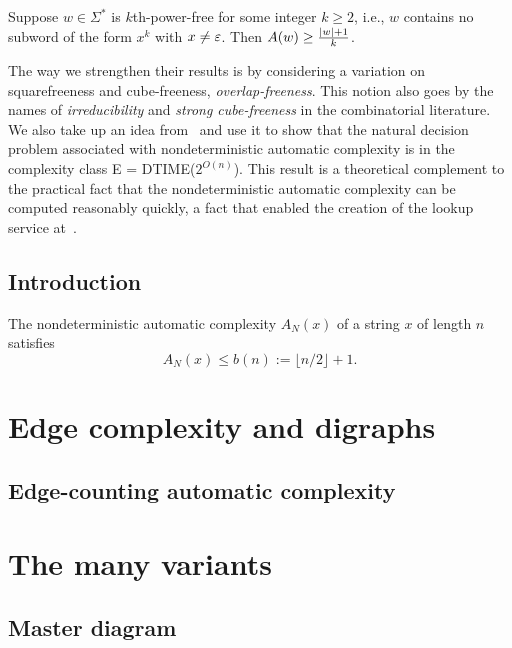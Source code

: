 	\begin{theorem}\label{thm:sw9}
		Suppose $w\in\Sigma^*$ is $k$th-power-free for some integer $k\ge 2$, i.e., $w$ contains no subword of the form $x^k$ with $x\ne\varepsilon$.
		Then $A(w)\ge\frac{\lvert w\rvert+1}k$.
	\end{theorem}
	The way we strengthen their results is by considering a variation
	on squarefreeness and cube-freeness, \emph{overlap-freeness}.
	This notion also goes by the names of \emph{irreducibility} and \emph{strong cube-freeness} in the combinatorial literature.
	We also take up an idea from~\cite[Theorem 8]{MR1897300} and use it to show that
	the natural decision problem associated with nondeterministic automatic complexity is in the complexity class E = DTIME($2^{O(n)}$).
	This result is a theoretical complement to the practical fact that
	the nondeterministic automatic complexity can be computed reasonably quickly, a fact that enabled the creation of the lookup service at~\cite{lookup}.

	\section{Introduction}
		\begin{theorem}\label{Hyde}\label{hydebound}
			\leanok
			The nondeterministic automatic complexity $A_N(x)$ of a string $x$ of length $n$ satisfies
			\[
				A_N(x) \le b(n):={\lfloor} n/2 {\rfloor} + 1\text{.}
			\]
		\end{theorem}


\chapter{Edge complexity and digraphs}\label{chap:digraph}

	\section{Edge-counting automatic complexity}

\chapter{The many variants}\label{chap:determine}

\section{Master diagram}

